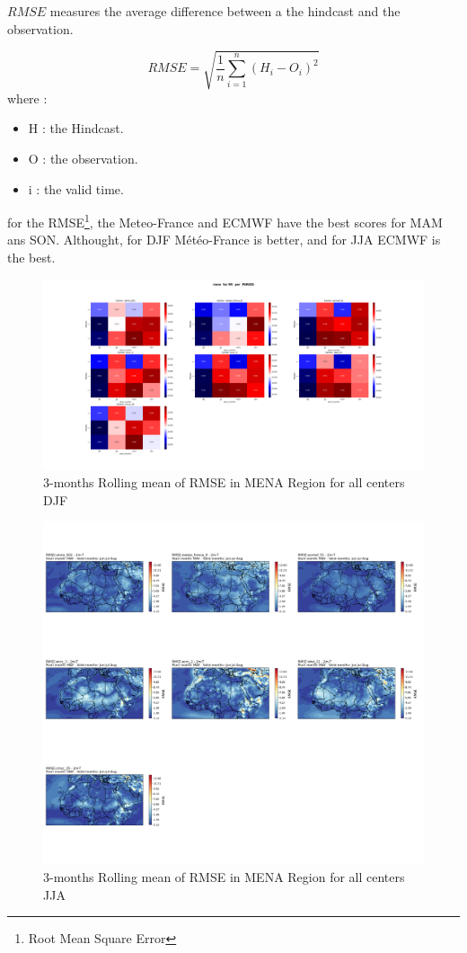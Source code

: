  $RMSE$ measures the average difference between a the hindcast and the observation.
 
$$RMSE=\sqrt{\frac{1}{n} \sum\limits_{i=1}^{n}(H_i -O_i)^2}$$
where :
\begin{itemize}
	\item H : the Hindcast.
	\item O : the observation.
	\item i : the valid time.
\end{itemize}

for the RMSE\footnote{Root Mean Square Error}, the Meteo-France and ECMWF have the best scores for MAM ans SON. Althought, for DJF Météo-France is better, and for JJA ECMWF is the best.

\begin{figure}[H]
\includegraphics[scale=0.3]{rmse_RR_PERIOD.png}
\caption{3-months Rolling mean of RMSE in MENA Region for all centers DJF}
\end{figure}

\begin{figure}[H]
\includegraphics[scale=0.3]{RMSE_JJA.png}
\caption{3-months Rolling mean of RMSE in MENA Region for all centers JJA}
\end{figure}



